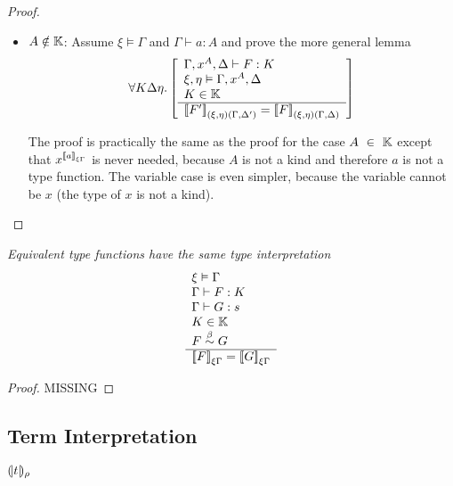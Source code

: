 \begin{theorem}
\begin{proof}
\begin{itemize}
        \item $A \notin \mathbb{K}$:
            Assume $\xi \vDash \Gamma$ and $\Gamma \vdash a : A$ and prove the
            more general lemma
            $$
            \forall K \Delta \eta. \left[ \begin{array}{l} 
                \Gamma,x^A,\Delta \vdash F : K
                \\
                \xi,\eta \vDash \Gamma,x^A,\Delta
                \\
                K \in \mathbb{K}
             \\ \hline 
                {{[\![}F'{]\!]}}_{(\xi,\eta)(\Gamma,\Delta')}
                =
                {{[\![} F{]\!]}}_{(\xi,\eta)(\Gamma,\Delta)}
            \end{array} \right]
            $$

            The proof is practically the same as the proof for the case
            $A \in \Kinds$ except that $x^{{{[\![} a{]\!]}}_{\xi\Gamma}}$ is never needed, because $A$
            is not a kind and therefore $a$ is not a type function. The variable
            case is even simpler, because the variable cannot be $x$ (the type
            of $x$ is not a kind).
        \end{itemize}
    \end{proof}
\end{theorem}



\begin{theorem}
    \label{TypeInterpretationEquivalence}
    \emph{Equivalent type functions have the same type interpretation}
    $$
    \begin{array}{l} 
        \xi \vDash \Gamma
        \\
        \Gamma \vdash F : K
        \\
        \Gamma \vdash G : s
        \\
        K \in \mathbb{K}
        \\
        F \stackrel{\beta}{\sim} G
     \\ \hline 
        {{[\![}F{]\!]}}_{\xi\Gamma} = {{[\![} G{]\!]}}_{\xi\Gamma}
    \end{array}
    $$
    \begin{proof}
        MISSING
    \end{proof}
\end{theorem}




\subsection{Term Interpretation}

${(\!|t|\!)_{\rho}}$







